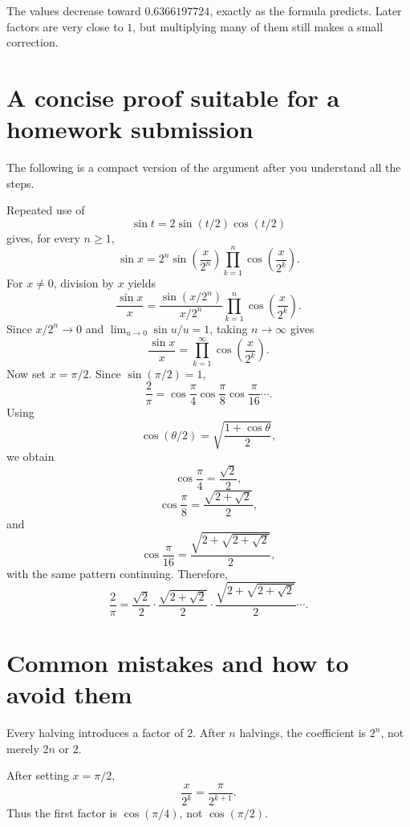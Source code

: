 \documentclass[11pt]{article}
\begin{document}
The values decrease toward \(0.6366197724\), exactly as the formula predicts. Later factors are very close to \(1\), but multiplying many of them still makes a small correction.

\section{A concise proof suitable for a homework submission}

The following is a compact version of the argument after you understand all the steps.

\begin{solutionBox}
Repeated use of
\[
  \sin t=2\sin(t/2)\cos(t/2)
\]
gives, for every \(n\ge1\),
\[
  \sin x
  =2^n\sin\!\left(\frac{x}{2^n}\right)
   \prod_{k=1}^{n}\cos\!\left(\frac{x}{2^k}\right).
\]
For \(x\ne0\), division by \(x\) yields
\[
  \frac{\sin x}{x}
  =\frac{\sin(x/2^n)}{x/2^n}
   \prod_{k=1}^{n}\cos\!\left(\frac{x}{2^k}\right).
\]
Since \(x/2^n\to0\) and \(\lim_{u\to0}\sin u/u=1\), taking \(n\to\infty\) gives
\[
  \frac{\sin x}{x}
  =\prod_{k=1}^{\infty}\cos\!\left(\frac{x}{2^k}\right).
\]
Now set \(x=\pi/2\). Since \(\sin(\pi/2)=1\),
\[
  \frac{2}{\pi}
  =\cos\frac{\pi}{4}\cos\frac{\pi}{8}
   \cos\frac{\pi}{16}\cdots .
\]
Using
\[
  \cos(\theta/2)=\sqrt{\frac{1+\cos\theta}{2}},
\]
we obtain
\[
  \cos\frac{\pi}{4}=\frac{\sqrt2}{2},
\]
\[
  \cos\frac{\pi}{8}=\frac{\sqrt{2+\sqrt2}}{2},
\]
and
\[
  \cos\frac{\pi}{16}
  =\frac{\sqrt{2+\sqrt{2+\sqrt2}}}{2},
\]
with the same pattern continuing. Therefore,
\[
  \frac{2}{\pi}
  =\frac{\sqrt2}{2}\cdot
   \frac{\sqrt{2+\sqrt2}}{2}\cdot
   \frac{\sqrt{2+\sqrt{2+\sqrt2}}}{2}\cdots .
\]
\end{solutionBox}

\section{Common mistakes and how to avoid them}

\begin{warningBox}
Every halving introduces a factor of \(2\). After \(n\) halvings, the coefficient is \(2^n\), not merely \(2n\) or \(2\).
\end{warningBox}

\begin{warningBox}
After setting \(x=\pi/2\),
\[
  \frac{x}{2^k}=\frac{\pi}{2^{k+1}}.
\]
Thus the first factor is \(\cos(\pi/4)\), not \(\cos(\pi/2)\).
\end{warningBox}
\end{document}
